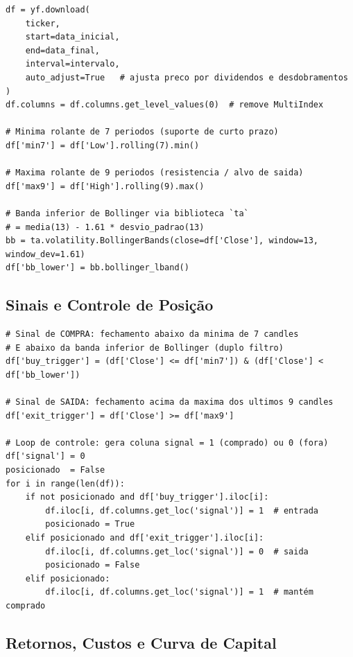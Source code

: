 \documentclass[12pt, a4paper]{article}
\begin{document}
\begin{lstlisting}[caption={Download dos dados e cálculo dos indicadores.}]
df = yf.download(
    ticker,
    start=data_inicial,
    end=data_final,
    interval=intervalo,
    auto_adjust=True   # ajusta preco por dividendos e desdobramentos
)
df.columns = df.columns.get_level_values(0)  # remove MultiIndex

# Minima rolante de 7 periodos (suporte de curto prazo)
df['min7'] = df['Low'].rolling(7).min()

# Maxima rolante de 9 periodos (resistencia / alvo de saida)
df['max9'] = df['High'].rolling(9).max()

# Banda inferior de Bollinger via biblioteca `ta`
# = media(13) - 1.61 * desvio_padrao(13)
bb = ta.volatility.BollingerBands(close=df['Close'], window=13, window_dev=1.61)
df['bb_lower'] = bb.bollinger_lband()
\end{lstlisting}

\subsection{Sinais e Controle de Posição}

\begin{lstlisting}[caption={Geração dos sinais e loop de controle de posição.}]
# Sinal de COMPRA: fechamento abaixo da minima de 7 candles
# E abaixo da banda inferior de Bollinger (duplo filtro)
df['buy_trigger'] = (df['Close'] <= df['min7']) & (df['Close'] < df['bb_lower'])

# Sinal de SAIDA: fechamento acima da maxima dos ultimos 9 candles
df['exit_trigger'] = df['Close'] >= df['max9']

# Loop de controle: gera coluna signal = 1 (comprado) ou 0 (fora)
df['signal'] = 0
posicionado  = False
for i in range(len(df)):
    if not posicionado and df['buy_trigger'].iloc[i]:
        df.iloc[i, df.columns.get_loc('signal')] = 1  # entrada
        posicionado = True
    elif posicionado and df['exit_trigger'].iloc[i]:
        df.iloc[i, df.columns.get_loc('signal')] = 0  # saida
        posicionado = False
    elif posicionado:
        df.iloc[i, df.columns.get_loc('signal')] = 1  # mantém comprado
\end{lstlisting}

\subsection{Retornos, Custos e Curva de Capital}
\end{document}

